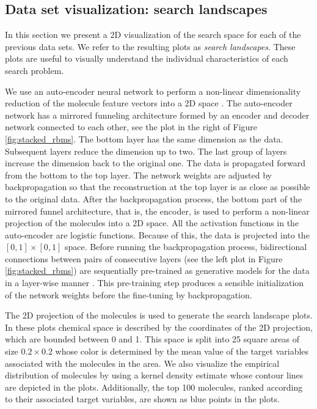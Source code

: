 \subsection{Data set visualization: search landscapes}

In this section we present a 2D visualization of the search space for each of
the previous data sets. We refer to the resulting plots as \emph{search
landscapes}. These plots are useful to visually understand the individual
characteristics of each search problem. 

We use an
auto-encoder neural network to perform a non-linear dimensionality reduction of the molecule feature vectors
into a 2D space \cite{Hinton_2006}. The auto-encoder network has a mirrored
funneling architecture formed by an encoder and decoder network connected to
each other, see the plot in the
right of Figure \ref{fig:stacked_rbms}. The bottom layer has the same dimension as the data. Subsequent
layers reduce the dimension up to two. The last group of layers
increase the dimension back to the original one. 
The data is propagated forward from the bottom to the top layer. The network
weights are adjusted by backpropagation so that the reconstruction at the top
layer is as close as possible to the original data. After
the backpropagation process, the bottom part of the mirrored funnel architecture, that is, the
encoder, is used to perform a non-linear projection of the molecules into a 2D
space. All the activation functions in the auto-encoder are logistic functions. Because of this, the data is projected into the $[0,1]\times[0,1]$ space. Before running the backpropagation process, bidirectional
connections between pairs of consecutive layers (see the left plot in Figure
\ref{fig:stacked_rbms}) are sequentially pre-trained as
generative models for the data in a layer-wise manner \cite{Hinton_2006}. This pre-training step
produces a sensible initialization of the network weights before the fine-tuning by backpropagation.

The 2D projection of the molecules is used to generate the search
landscape plots. In these plots chemical space is described by the coordinates of the 2D projection,
which are bounded between 0 and 1. This space is split into 25 square areas of size $0.2 \times 0.2$ whose 
color is determined by the mean value of the target variables associated with the molecules in the area. We also visualize the empirical distribution of molecules by using a kernel density estimate whose contour lines are depicted in the plots. Additionally, the top 100 molecules, ranked
according to their associated target variables, are shown as blue points in the plots.  

